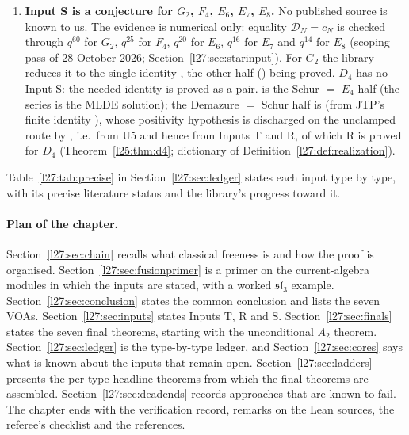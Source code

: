 \begin{enumerate}
\item[(vi)] \textbf{Input S is a conjecture for $G_2$, $F_4$, $E_6$, $E_7$, $E_8$.} No published source is known to us. The
  evidence is numerical only: equality $\mathcal D_N=c_N$ is checked through $q^{60}$ for $G_2$, $q^{25}$ for $F_4$, $q^{20}$
  for $E_6$, $q^{16}$ for $E_7$ and $q^{14}$ for $E_8$ (scoping pass of 28 October 2026; Section~\ref{l27:sec:starinput}). For $G_2$ the library reduces it to the
  single identity , the other half () being proved. $D_4$ has no Input S: the needed
  identity is proved as a pair.  is the Schur $=$ $E_4$ half (the series  is the MLDE
  solution); the Demazure $=$ Schur half is  (from JTP's finite identity
  ), whose positivity hypothesis is discharged on the unclamped route by
  , i.e.\ from U5 and hence from Inputs T and R, of which R is proved for $D_4$
  (Theorem~\ref{l25:thm:d4}; dictionary of Definition~\ref{l27:def:realization}).
\end{enumerate}
Table~\ref{l27:tab:precise} in Section~\ref{l27:sec:ledger} states each input type by type, with its precise literature
status and the library's progress toward it.

\paragraph{Plan of the chapter.}
Section~\ref{l27:sec:chain} recalls what classical freeness is and how the proof is organised.
Section~\ref{l27:sec:fusionprimer} is a primer on the current-algebra modules in which the inputs are stated, with a
worked $\mathfrak{sl}_3$ example. Section~\ref{l27:sec:conclusion} states the common conclusion and lists the seven
VOAs. Section~\ref{l27:sec:inputs} states Inputs T, R and S. Section~\ref{l27:sec:finals} states the seven final
theorems, starting with the unconditional $A_2$ theorem. Section~\ref{l27:sec:ledger} is the type-by-type ledger, and
Section~\ref{l27:sec:cores} says what is known about the inputs that remain open. Section~\ref{l27:sec:ladders}
presents the per-type headline theorems from which the final theorems are assembled. Section~\ref{l27:sec:deadends}
records approaches that are known to fail. The chapter ends with the verification record, remarks on the Lean sources,
the referee's checklist and the references.

